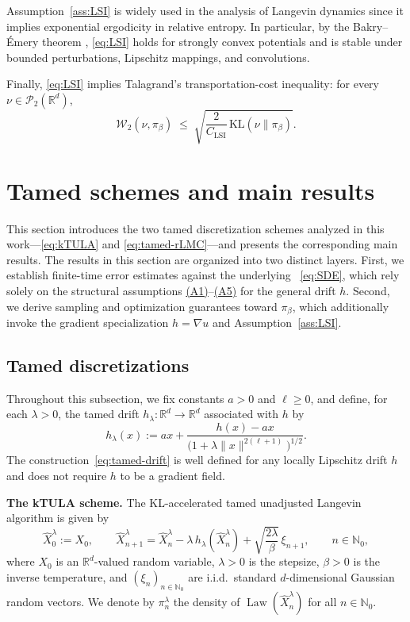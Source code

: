 \documentclass[11pt,a4paper,reqno]{amsart}
\theoremstyle{plain}
\theoremstyle{definition}
\theoremstyle{remark}
\newcommand{\R}{\mathbb{R}}
\newcommand{\KL}{\mathrm{KL}}
\newcommand{\W}{\mathcal{W}_2}
\DeclareMathOperator{\Law}{Law}
\begin{document}
\medskip
Assumption~\ref{ass:LSI} is widely used in the analysis of Langevin dynamics since it implies exponential
ergodicity in relative entropy. In particular, by the Bakry--\'Emery theorem \cite{bakry2006diffusions}, \eqref{eq:LSI} holds for
strongly convex potentials and is stable under bounded perturbations, Lipschitz mappings, and
convolutions.

\medskip
\noindent
Finally, \eqref{eq:LSI} implies Talagrand's transportation-cost inequality: for every $\nu\in\mathcal P_2(\R^d)$,
\begin{equation}\tag{TI}\label{eq:TI}
  \W(\nu,\pi_\beta)
  \;\le\;
  \sqrt{\frac{2}{C_{\mathrm{LSI}}}\,\KL(\nu\|\pi_\beta)}.
\end{equation}


\section{Tamed schemes and main results}
\label{sec:main-results}

This section introduces the two tamed discretization schemes analyzed in this work---\eqref{eq:kTULA} and \eqref{eq:tamed-rLMC}---and presents the corresponding main results. The results in this section are organized into two distinct layers. First, we establish finite-time error estimates against the underlying ~\eqref{eq:SDE}, which rely solely on the structural assumptions \hyperref[ass:PJG]{(A1)}--\hyperref[ass:JLC]{(A5)} for the general drift $h$. Second, we derive sampling and optimization guarantees toward $\pi_\beta$, which additionally invoke the gradient specialization $h=\nabla u$ and Assumption~\ref{ass:LSI}.


\subsection{Tamed discretizations}
\label{subsec:tamed-discretizations}

Throughout this subsection, we fix constants $a>0$ and $\ell\ge 0$, and define, for each $\lambda>0$, the tamed drift $h_\lambda:\R^d\to\R^d$ associated with $h$ by
\begin{equation}
h_\lambda(x)
:=
a x
+
\frac{h(x)-a x}
{\bigl(1+\lambda\|x\|^{2(\ell+1)}\bigr)^{1/2}}.
\label{eq:tamed-drift}
\end{equation}
The construction~\eqref{eq:tamed-drift} is well defined for any locally Lipschitz drift $h$ and does not require $h$ to be a gradient field.

\medskip
\noindent\textbf{The kTULA scheme.}
The KL-accelerated tamed unadjusted Langevin algorithm is given by
\begin{equation}
\widehat X_0^\lambda := X_0,
\qquad
\widehat X_{n+1}^\lambda
=
\widehat X_n^\lambda
-
\lambda\, h_\lambda(\widehat X_n^\lambda)
+
\sqrt{\frac{2\lambda}{\beta}}\,\xi_{n+1},
\qquad n\in\mathbb{N}_0,
\tag{kTULA}\label{eq:kTULA}
\end{equation}
where $X_0$ is an $\R^d$-valued random variable, $\lambda>0$ is the stepsize, $\beta>0$ is the inverse temperature, and
$(\xi_n)_{n\in\mathbb{N}_0}$ are i.i.d.\ standard $d$-dimensional Gaussian random vectors. We denote by $\pi_n^\lambda$ the density of $\Law(\widehat X_n^\lambda)$ for all $n\in\mathbb{N}_0$.
\end{document}
